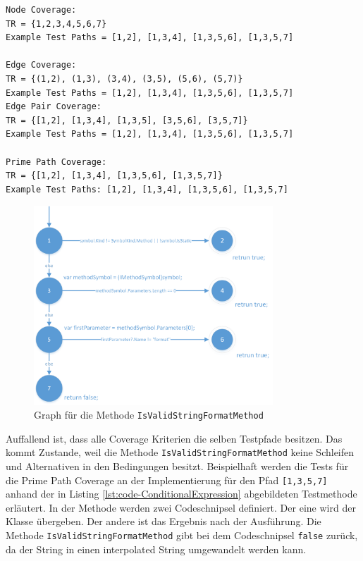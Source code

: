 \begin{lstlisting}[caption={Coverage für die Mehtode \texttt{IsValidStringFormatMethod}},
label=lst:coverage-IsValidStringFormatMethod]
Node Coverage:
TR = {1,2,3,4,5,6,7}
Example Test Paths = [1,2], [1,3,4], [1,3,5,6], [1,3,5,7]

Edge Coverage:
TR = {(1,2), (1,3), (3,4), (3,5), (5,6), (5,7)}
Example Test Paths = [1,2], [1,3,4], [1,3,5,6], [1,3,5,7]
Edge Pair Coverage:
TR = {[1,2], [1,3,4], [1,3,5], [3,5,6], [3,5,7]}
Example Test Paths = [1,2], [1,3,4], [1,3,5,6], [1,3,5,7]

Prime Path Coverage:
TR = {[1,2], [1,3,4], [1,3,5,6], [1,3,5,7]}
Example Test Paths: [1,2], [1,3,4], [1,3,5,6], [1,3,5,7]
\end{lstlisting}
\begin{figure}[h]
	\centering
	\includegraphics[width=0.8\textwidth]{images/GraphISValidStringFormatMethod.png}
	\caption{Graph für die Methode \texttt{IsValidStringFormatMethod}}
	\label{fig:graph-validstring}
\end{figure}
Auffallend ist, dass alle Coverage Kriterien die selben Testpfade besitzen. Das kommt Zustande, weil die Methode \texttt{IsValidStringFormatMethod} keine Schleifen und Alternativen in den Bedingungen besitzt. Beispielhaft werden die Tests für die Prime Path Coverage an der Implementierung für den Pfad \texttt{[1,3,5,7]} anhand der in Listing \ref{lst:code-ConditionalExpression} abgebildeten Testmethode erläutert. In der Methode werden zwei Codeschnipsel definiert. Der eine wird der Klasse übergeben. Der andere ist das Ergebnis nach der Ausführung. Die Methode \texttt{IsValidStringFormatMethod} gibt bei dem Codeschnipsel \texttt{false} zurück, da der String in einen interpolated String umgewandelt werden kann.

